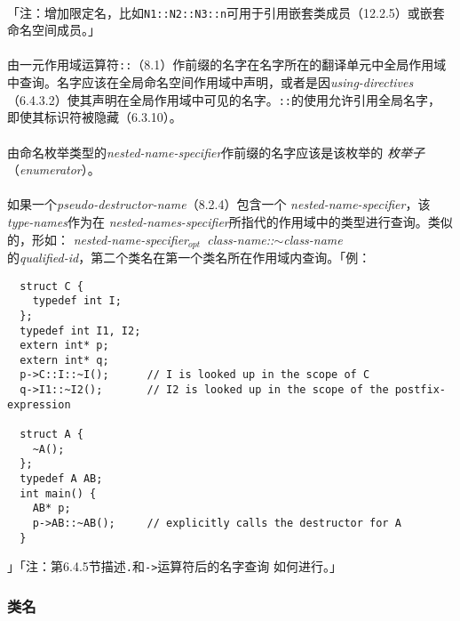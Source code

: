 \paragraph{}
「注：增加限定名，比如\texttt{N1::N2::N3::n}可用于引用嵌套类成员（12.2.5）或嵌套
命名空间成员。」

\paragraph{}
由一元作用域运算符\texttt{::}（8.1）作前缀的名字在名字所在的翻译单元中全局作用域
中查询。名字应该在全局命名空间作用域中声明，或者是因\textit{using-directives}
（6.4.3.2）使其声明在全局作用域中可见的名字。\texttt{::}的使用允许引用全局名字，
即使其标识符被隐藏（6.3.10）。

\paragraph{}
由命名枚举类型的\textit{nested-name-specifier}作前缀的名字应该是该枚举的
\textit{枚举子}（\textit{enumerator}）。

\paragraph{}
如果一个\textit{pseudo-destructor-name}（8.2.4）包含一个
\textit{nested-name-specifier}，该\textit{type-names}作为在
\textit{nested-names-specifier}所指代的作用域中的类型进行查询。类似的，形如：
\mbox{\qquad\textit{nested-name-specifier$_{opt}$ class-name::$\sim$class-name}}
\\
的\textit{qualified-id}，第二个类名在第一个类名所在作用域内查询。「例：
\begin{lstlisting}
  struct C {
    typedef int I;
  };
  typedef int I1, I2;
  extern int* p;
  extern int* q;
  p->C::I::~I();      // I is looked up in the scope of C
  q->I1::~I2();       // I2 is looked up in the scope of the postfix-expression

  struct A {
    ~A();
  };
  typedef A AB;
  int main() {
    AB* p;
    p->AB::~AB();     // explicitly calls the destructor for A
  }
\end{lstlisting}」「注：第6.4.5节描述\texttt{.}和\texttt{->}运算符后的名字查询
如何进行。」

\subsubsection{类名}
